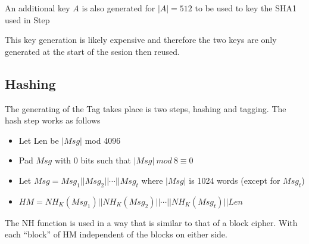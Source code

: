 \documentclass[11pt]{article} %
\begin{document}
An additional key $A$ is also generated for $|A|=512$ to be used to key the
SHA1 used in Step %

This key generation is likely expensive and therefore the two keys are only
generated at the start of the sesion then reused.

\subsection{Hashing}
The generating of the Tag takes place is two steps, hashing and tagging. The
hash step works as follows
\begin{itemize}
\item Let Len be $|Msg|$ mod 4096
\item Pad $Msg$ with 0 bits such that $|Msg|\ mod\ 8 \equiv 0$
\item Let $Msg=Msg_1||Msg_2||\cdots||Msg_t$ where $|Msg|$ is 1024 words (except
for $Msg_t$)
\item $HM = NH_K(Msg_1)||NH_K(Msg_2)||\cdots||NH_K(Msg_t)||Len$
\end{itemize}
The NH function is used in a way that is similar to that of a block cipher.
With each ``block'' of HM independent of the blocks on either side. 
\end{document}
